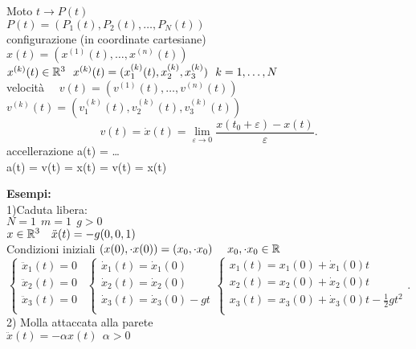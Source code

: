 \documentclass[12px]{article}
\begin{document}
	\begin{nota}
		Moto $t \rightarrow P(t)$\\
		$P(t) = (P_1(t), P_2(t), \ldots,P_N(t))$\\
		configurazione (in coordinate cartesiane)\\
		$x(t) = (x^{(1)}(t),\ldots,x^{(n)}(t))$\\
		$x^{(k)}(t)\in \mathbb{R}^3\ \ x^{(k)}(t) = (x_1^{(k)}(t), x_2^{(k)},x_3^{(k)})\ \ k = 1,\ldots, N$\\
		velocità \ \ $v(t) = (v^{(1)}(t), \ldots, v^{(n)}(t))$ \ \  $v^{(k)}(t) = (v_1^{(k)}(t), v_2^{(k)}(t), v_3^{(k)}(t))$\\
		 \[
			 v(t) = \dot x(t)  = \lim_{\varepsilon \rightarrow 0}\frac{x(t_0 + \varepsilon) - x(t)}{\varepsilon}
		.\] 
		accellerazione a(t) = \ldots\\
		a(t) = \dot v(t)  = \ddot x(t) = v(t) = x(t)
	\end{nota}
	\textbf{Esempi:}\\
	1)Caduta libera:\\
	$N = 1\ \ m =1 \ \ g > 0$\\
	 $x\in \mathbb{R}^3 \ \ \ \ddot x(t) = -g(0,0,1)$\\
	 Condizioni iniziali $(x(0),\cdot x(0)) = (x_0,\cdot x_0)\ \ \ \ x_0,\cdot x_0 \in \mathbb{R}$\\
	 \[
	 \begin{cases}
	 	\ddot x_1(t) = 0\\
	 	\ddot x_2(t) = 0\\
	 	\ddot x_3(t) = 0\\
	 \end{cases} \ \ 
	 \begin{cases}
	 	\dot x_1(t) = \dot x_1(0)\\
	 	\dot x_2(t) = \dot x_2(0)\\
	 	\dot x_3(t) =\dot x_3(0) - gt\\
	 \end{cases}
	 \begin{cases}
	 	x_1(t) = x_1(0) +\dot x_1(0)t\\
	 	x_2(t) = x_2(0) +\dot x_2(0)t\\
	 	x_3(t) =x_3(0) +\dot x_3(0)t - \frac 12gt^2\\
	 \end{cases}
	 .\] 
	 2) Molla attaccata alla parete\\
	 $\ddot x(t) = -\alpha x (t) \ \ \alpha > 0$\\
\end{document}
